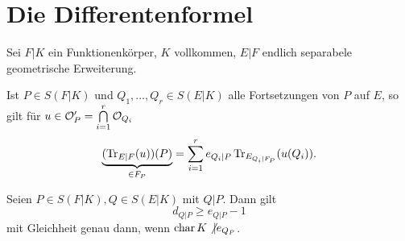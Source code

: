 \section{Die Differentenformel}
Sei $F|K$ ein Funktionenkörper, $K$ vollkommen, $E|F$ endlich separabele geometrische Erweiterung.

\begin{lemma}
    Ist $P \in S(F|K)$ und $Q_1,\ldots,Q_r \in S(E|K)$ alle Fortsetzungen von $P$ auf $E$, so gilt für $u \in \mathcal{O}'_P=\bigcap\limits_{i=1}^r \mathcal{O}_{Q_i}$
    $$ \underbrace{(\operatorname{Tr}_{E|F}(u))(P)}_{\in F_P} = \sum_{i=1}^r e_{Q_i|P}\operatorname{Tr}_{E_{Q_i|F_P}}(u(Q_i)).$$
\end{lemma}

\begin{theorem}[Dedekind]
    Seien $P\in S(F|K), Q \in S(E|K)$ mit $Q|P$. Dann gilt 
    $$d_{Q|P} \geq e_{Q|P} - 1$$
    mit Gleichheit genau dann, wenn $\operatorname{char} K \not | e_{Q_P}$.
\end{theorem}

